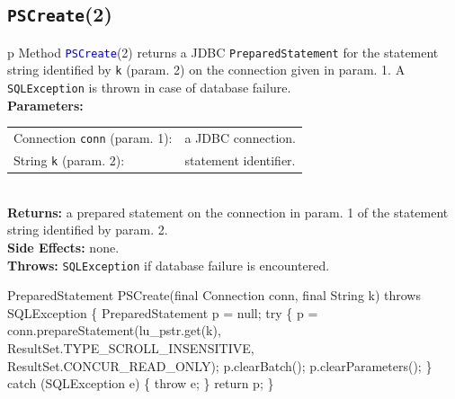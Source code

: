 \subsection{\texttt{PSCreate}(2)}
\begin{tabular}{p{\textwidth}}
\toprule
{}
Method \textcolor{blue}{{\tt{}\protect{}PSCreate}}(2) returns a JDBC {\tt{}PreparedStatement} for the
statement string identified by {\tt{}k} (param. 2) on the connection given in
param. 1.  A {\tt{}SQLException} is thrown in case of database failure.\\
\midrule
\textbf{Parameters:} \\
\begin{tabular}{lp{116mm}}
Connection {\tt{}conn} (param. 1):&a JDBC connection.\\
String {\tt{}k} (param. 2):&statement identifier.\\
\end{tabular}\\
\textbf{Returns:} a prepared statement on the connection in param. 1 of the
statement string identified by param. 2.\\
\textbf{Side Effects:} none.\\
\textbf{Throws:} {\tt{}SQLException} if database failure is encountered.\\
\bottomrule
\end{tabular}
\nwenddocs{}\endmoddef{}
PreparedStatement PSCreate(final Connection conn, final String k) throws SQLException \{
  PreparedStatement p = null;
  try \{
    p = conn.prepareStatement(lu_pstr.get(k),
      ResultSet.TYPE_SCROLL_INSENSITIVE, ResultSet.CONCUR_READ_ONLY);
    p.clearBatch();
    p.clearParameters();
  \} catch (SQLException e) \{
    throw e;
  \}
  return p;
\}
\eatline
{}\nwendcode{}\nwdocspar
